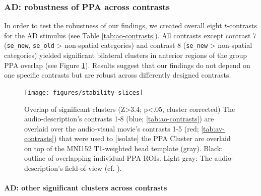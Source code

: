 \documentclass[english]{article}
\begin{document}
\subsubsection{AD: robustness of PPA across contrasts}


In order to test the robustness of our findings, we created overall eight
$t$-contrasts for the AD stimulus (see Table \ref{tab:ao-contrasts}).
All contrasts except contrast 7 (\texttt{se\_new}, \texttt{se\_old} >
non-spatial categories) and contrast 8 (\texttt{se\_new} > non-spatial
categories) yielded significant bilateral clusters in anterior regions of the
group PPA overlap (see Figure \ref{fig:stability-slices}).
Results suggest that our findings do not depend on one specific contrasts but
are robust across differently designed contrasts.
%

\begin{figure} \centering
    \texttt{[image: figures/stability-slices]}
    \caption{Overlap of significant clusters (Z>3.4; p<.05, cluster corrected)
        The audio-description's contrasts 1-8 (blue; \ref{tab:ao-contrasts})
        are overlaid over the audio-visual movie's contrasts 1-5 (red;
        \ref{tab:av-contrasts}) that were used to [isolate] the PPA
        Cluster are overlaid on top of the MNI152 T1-weighted head template
        (gray).
        Black: outline of overlapping individual PPA ROIs.
        Light gray: The audio-description's field-of-view (cf.
        \citep{hanke2014audiomovie}).}
    \label{fig:stability-slices}
    \end{figure}

\paragraph{AD: other significant clusters across contrasts}
\end{document}
